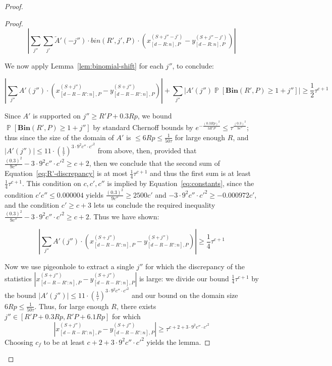 \documentclass[10pt,a4paper]{amsart}
\newcommand{\Bin}[2]{\textbf{Bin}(#1,#2)}
\renewcommand{\Pr}{\operatorname*{\mathbb{P}}}
\begin{document}
\begin{proof}
\begin{proof}
    \[|\sum_{j''} \sum_{j'} \overleftarrow{A}'(-j'')\cdot bin(R',j',P)\cdot(x_{[d-R:n],P}^{(S+j''-j')}-y_{[d-R:n],P}^{(S+j''-j')})|\]

    We now apply Lemma~\ref{lem:binomial-shift} for each $j''$, to conclude:

    \begin{equation}\label{eq:R'-discrepancy}|\sum_{j''} A'(j'')\cdot (x_{[d-R-R':n],P}^{(S+j'')}-y_{[d-R-R':n],P}^{(S+j'')})|+\sum_{j''} |A'(j'')\Pr[\Bin{R'}{P}\geq 1+j'']|\geq \frac{1}{2}\tau^{c+1}\end{equation}

    

    Since $A'$ is supported on $j''\geq R'P+0.3Rp$, we bound $\Pr[\Bin{R'}{P}\geq 1+j'']$ by standard Chernoff bounds by $e^{-\frac{(0.3Rp)^2}{3R'P}}\leq \tau^{\frac{(0.3)^2}{9c''}}$; thus since the size of the domain of $A'$ is $\leq 6Rp\leq \frac{1}{50\tau}$ for large enough $R$, and $|A'(j'')|\leq 11\cdot (\frac{1}{\tau})^{3\cdot 9^2c''\cdot {c'}^2}$ from above, then, provided that $\frac{(0.3)^2}{9c''}-3\cdot 9^2c''\cdot {c'}^2 \geq c+2$, then we conclude that the second sum of Equation~\ref{eq:R'-discrepancy} is at most $\frac{1}{4}\tau^{c+1}$ and thus the first sum is at least $\frac{1}{4}\tau^{c+1}$. This condition on $c,c',c''$ is implied by Equation~\ref{eq:constants}, since the condition $c'c''\leq 0.000004$ yields $\frac{(0.3)^2}{9c''}\geq 2500c'$ and $-3\cdot 9^2c''\cdot {c'}^2\geq -0.000972c'$, and the condition $c'\geq c+3$ lets us conclude the required inequality $\frac{(0.3)^2}{9c''}-3\cdot 9^2c''\cdot {c'}^2 \geq c+2$. Thus we have shown:

    \[|\sum_{j''} A'(j'')\cdot (x_{[d-R-R':n],P}^{(S+j'')}-y_{[d-R-R':n],P}^{(S+j'')})|\geq \frac{1}{4}\tau^{c+1}\]

    Now we use pigeonhole to extract a single $j''$ for which the discrepancy of the statistics $|x_{[d-R-R':n],P}^{(S+j'')}-y_{[d-R-R':n],P}^{(S+j'')}|$ is large: we divide our bound $\frac{1}{4}\tau^{c+1}$ by the bound $|A'(j'')|\leq 11\cdot (\frac{1}{\tau})^{3\cdot 9^2c''\cdot {c'}^2}$ and our bound on the domain size $6Rp\leq \frac{1}{50\tau}$. Thus, for large enough $R$, there exists $j''\in [R'P+0.3Rp,R'P+6.1Rp]$ for which 
    \begin{equation}|x_{[d-R-R':n],P}^{(S+j'')}-y_{[d-R-R':n],P}^{(S+j'')}|\geq \tau^{c+2+3\cdot 9^2c''\cdot {c'}^2}\end{equation}
    Choosing $c_f$ to be at least $c+2+3\cdot 9^2c''\cdot {c'}^2$ yields the lemma.
\end{proof}




\end{proof}
\end{document}
